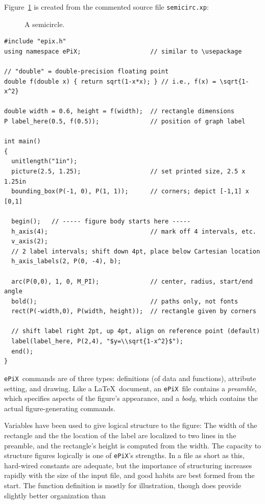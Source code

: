 \documentclass[12pt]{report}
\newcommand{\code}[1]{\texttt{#1}}
\newcommand{\filename}[1]{\texttt{#1}}
\newcommand{\ePiX}{\code{ePiX}}
\begin{document}
Figure~\ref{fig:example} is created from the commented source file
\filename{semicirc.xp}:
\begin{figure}[tb]
\begin{center}

\caption{A semicircle.}
\label{fig:example}
\end{center}
\end{figure}
\begin{footnotesize}
\begin{verbatim}
#include "epix.h"
using namespace ePiX;                   // similar to \usepackage

// "double" = double-precision floating point
double f(double x) { return sqrt(1-x*x); } // i.e., f(x) = \sqrt{1-x^2}

double width = 0.6, height = f(width);  // rectangle dimensions
P label_here(0.5, f(0.5));              // position of graph label

int main() 
{
  unitlength("1in");
  picture(2.5, 1.25);                   // set printed size, 2.5 x 1.25in
  bounding_box(P(-1, 0), P(1, 1));      // corners; depict [-1,1] x [0,1]

  begin();   // ----- figure body starts here -----
  h_axis(4);                            // mark off 4 intervals, etc.
  v_axis(2);  
  // 2 label intervals; shift down 4pt, place below Cartesian location
  h_axis_labels(2, P(0, -4), b);    

  arc(P(0,0), 1, 0, M_PI);              // center, radius, start/end angle
  bold();                               // paths only, not fonts
  rect(P(-width,0), P(width, height));  // rectangle given by corners

  // shift label right 2pt, up 4pt, align on reference point (default)
  label(label_here, P(2,4), "$y=\\sqrt{1-x^2}$");
  end();
}
\end{verbatim}
\end{footnotesize}
\ePiX\ commands are of three types: definitions (of data and
functions), attribute setting, and drawing.  Like a \LaTeX\ document,
an \ePiX\ file contains a \emph{preamble}, which specifies aspects of
the figure's appearance, and a \emph{body}, which contains the actual
figure-generating commands.

Variables have been used to give logical structure to the figure: The
width of the rectangle and the the location of the label are localized
to two lines in the preamble, and the rectangle's height is computed
from the width.  The capacity to structure figures logically is one of
\ePiX's strengths. In a file as short as this, hard-wired constants
are adequate, but the importance of structuring increases rapidly with
the size of the input file, and good habits are best formed from the
start. The function definition is mostly for illustration, though does
provide slightly better organization than
\end{document}
